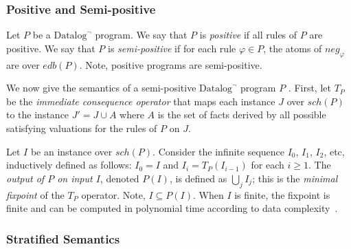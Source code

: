\documentclass{tlp}
\newcommand{\langname}[1]{\text{#1}}  \newcommand{\pred}[1]{\mathtt{#1}}  \newcommand{\fname}[1]{\mathit{#1}}  \newcommand{\sq}[1]{`{#1}'}
\newcommand{\datalogneg}{\langname{Datalog}^{\neg}}
\newcommand{\rl}{\varphi}
\newcommand{\bneg}[1]{\fname{neg}_{#1}}
\newcommand{\edb}[1]{\fname{edb}(#1)}
\newcommand{\schof}[1]{\fname{sch}(#1)}
\begin{document}
\subsubsection{Positive and Semi-positive}

\newcommand{\tp}{T_{P}}


\label{sub:positive-and-semi-positive}

Let $P$ be a $\datalogneg$ program. We say that $P$ is \emph{positive}
if all rules of $P$ are positive. We say that $P$ is \emph{semi-positive}
if for each rule $\rl\in P$, the atoms of $\bneg{\rl}$ are over
$\edb P$. Note, positive programs are semi-positive.

We now give the semantics of a semi-positive $\datalogneg$ program
$P$ \cite{ahv_book}. First, let $\tp$ be the \emph{immediate consequence
operator} that maps each instance $J$ over $\schof P$ to the instance
$J'=J\cup A$ where $A$ is the set of facts derived by all possible
satisfying valuations for the rules of $P$ on $J$. 

Let $I$ be an instance over $\schof P$. Consider the infinite sequence
$I_{0}$, $I_{1}$, $I_{2}$, etc, inductively defined as follows:
$I_{0}=I$ and $I_{i}=\tp(I_{i-1})$ for each $i\geq1$. The \emph{output
of $P$ on input $I$}, denoted $P(I)$, is defined as $\bigcup_{j}I_{j}$;
this is the \emph{minimal fixpoint} of the $T_{P}$ operator. Note,
$I\subseteq P(I)$. When $I$ is finite, the fixpoint is finite and
can be computed in polynomial time according to data complexity~\cite{vardi_comp}.




\subsubsection{Stratified Semantics}

\label{sub:stratified-semantics}
\end{document}
